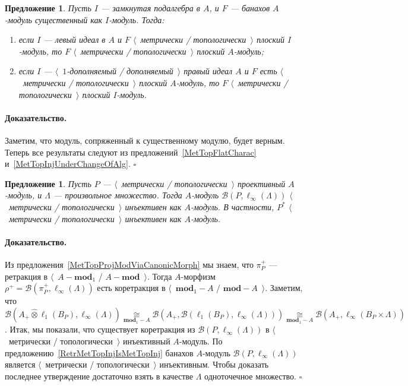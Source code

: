 \documentclass[12pt]{article}
\newcommand{\projtens}{\mathbin{\widehat{\otimes}}}
\newcommand{\isom}[1]{\mathop{\mathbin{\cong}}\limits_{#1}}
\newtheorem{proposition}[theorem]{Предложение}
\renewenvironment{proof}{\paragraph{Доказательство.}}{\hfill$\square$\medskip}
\begin{document}
\begin{proposition}\label{MetTopFlatUnderChangeOfAlg} Пусть $I$ --- замкнутая
    подалгебра в $A$, и $F$ --- банахов $A$-модуль существенный как $I$-модуль.
    Тогда:
    \begin{enumerate}[label = (\roman*)]
        \item если $I$ --- левый идеал в $A$ и $F$ $\langle$~метрически /
              топологически~$\rangle$ плоский $I$-модуль, 
              то $F$ $\langle$~метрически / топологически~$\rangle$ 
              плоский $A$-модуль;

        \item если $I$ --- $\langle$~$1$-дополняемый / дополняемый~$\rangle$ 
              правый идеал $A$ и $F$ есть 
              $\langle$~метрически / топологически~$\rangle$ 
              плоский $A$-модуль, то $F$ 
              $\langle$~метрически / топологически~$\rangle$ 
              плоский $I$-модуль.
    \end{enumerate}

\end{proposition}
\begin{proof} Заметим, что модуль, сопряженный к существенному модулю, будет
    верным. Теперь все результаты следуют из предложений~\ref{MetTopFlatCharac}
    и~\ref{MetTopInjUnderChangeOfAlg}.
\end{proof}

\begin{proposition}\label{DualMetTopProjIsMetrInj} Пусть $P$ ---
    $\langle$~метрически / топологически~$\rangle$ проективный $A$-модуль, и
    $\Lambda$ --- произвольное множество. Тогда $A$-модуль
    $\mathcal{B}(P,\ell_\infty(\Lambda))$ $\langle$~метрически /
    топологически~$\rangle$ инъективен как $A$-модуль. В частности, $P^*$
    $\langle$~метрически / топологически~$\rangle$ инъективен как $A$-модуль.
\end{proposition}
\begin{proof} Из предложения~\ref{MetTopProjModViaCanonicMorph} мы знаем, что
    $\pi_P^+$ --- ретракция в $\langle$~$A-\mathbf{mod}_1$ /
    $A-\mathbf{mod}$~$\rangle$. Тогда $A$-морфизм
    $\rho^+=\mathcal{B}(\pi_P^+,\ell_\infty(\Lambda))$ есть коретракция в
    $\langle$~$\mathbf{mod}_1-A$ / $\mathbf{mod}-A$~$\rangle$. Заметим, что
    $\mathcal{B}(A_+\projtens\ell_1(B_P),\ell_\infty(\Lambda))
        \isom{\mathbf{mod}_1-A}
        \mathcal{B}(A_+,\mathcal{B}(\ell_1(B_P),\ell_\infty(\Lambda)))
        \isom{\mathbf{mod}_1-A}\mathcal{B}(A_+,\ell_\infty(B_P\times\Lambda))$.
    Итак, мы показали, что существует коретракция из
    $\mathcal{B}(P,\ell_\infty(\Lambda))$ в $\langle$~метрически /
    топологически~$\rangle$ инъективный $A$-модуль. По
    предложению~\ref{RetrMetTopInjIsMetTopInj} банахов $A$-модуль
    $\mathcal{B}(P,\ell_\infty(\Lambda))$ является $\langle$~метрически /
    топологически~$\rangle$ инъективным. Чтобы доказать последнее утверждение
    достаточно взять в качестве $\Lambda$ одноточечное множество.
\end{proof}
\end{document}
